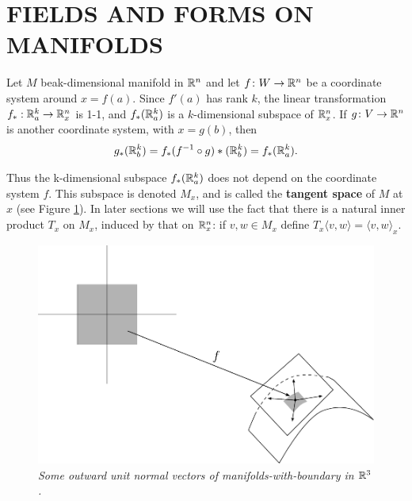 \clearpage
\section[\textsc{fields and forms on manifolds}]{FIELDS AND FORMS ON MANIFOLDS}
Let $M$ beak-dimensional manifold in $\mathbb{R}^n$ and let $f\colon{} W\to \mathbb{R}^n$
be a coordinate system around $x = f(a)$. Since $f'(a)$ has rank $k$, 
the linear transformation $f_*:\mathbb{R}^k_a\to\mathbb{R}^n_x$ is 1-1, and $f_*(\mathbb{R}^k_a)$
is a $k$-dimensional subspace of $\mathbb{R}^n_x$. If $g\colon{}V\to\mathbb{R}^n$ is another coordinate
system, with $x=g(b)$, then 
\begin{align*}
  g_*(\mathbb{R}^k_b) = f_*(f^{-1}\circ g)*(\mathbb{R}^k_b) = f_*(\mathbb{R}^k_a).
\end{align*}

Thus the k-dimensional subspace $f_*(\mathbb{R}^k_a)$ does not depend on
the coordinate system $f$. This subspace is denoted $M_x$, and
is called the \textbf{tangent space} of $M$ at $x$ (see Figure \ref{Fig 5-5}).
In later sections we will use the fact that there is a natural inner
product $T_x$ on $M_x$, induced by that on $\mathbb{R}^n_x$: if $v,w\in M_x$ define
$T_x\langle v,w\rangle = \langle v,w\rangle_x$.

\begin{figure}[!htb]
  \centering
  \includegraphics[width=.75\linewidth]{./pics/Fig5-5.pdf}
  \caption{\textit{Some outward unit normal vectors of manifolds-with-boundary in $\mathbb{R}^3$.}}
  \label{Fig 5-5}
\end{figure}

